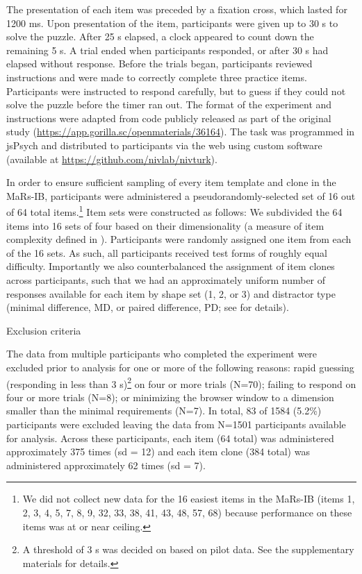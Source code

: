 \documentclass[a4paper,man,natbib]{apa6}
\makeatletter
\renewcommand{\subsubsection}{\@startsection{subsubsection}{3}
  {\z@}%
  {\b@level@two@skip}{\e@level@two@skip}%
  {\normalfont\normalsize\bfseries}}
\makeatother
\begin{document}
The presentation of each item was preceded by a fixation cross, which lasted for 1200 ms. Upon presentation of the item, participants were given up to 30 s to solve the puzzle. After 25 s elapsed, a clock appeared to count down the remaining 5 s. A trial ended when participants responded, or after 30 s had elapsed without response. Before the trials began, participants reviewed instructions and were made to correctly complete three practice items. Participants were instructed to respond carefully, but to guess if they could not solve the puzzle before the timer ran out. The format of the experiment and instructions were adapted from code publicly released as part of the original study (\url{https://app.gorilla.sc/openmaterials/36164}). The task was programmed in jsPsych \citep{de2015jspsych} and distributed to participants via the web using custom software (available at \url{https://github.com/nivlab/nivturk}). 

In order to ensure sufficient sampling of every item template and clone in the MaRs-IB, participants were administered a pseudorandomly-selected set of 16 out of 64 total items.\footnote{We did not collect new data for the 16 easiest items in the MaRs-IB (items 1, 2, 3, 4, 5, 7, 8, 9, 32, 33, 38, 41, 43, 48, 57, 68) because performance on these items was at or near ceiling.} Item sets were constructed as follows: We subdivided the 64 items into 16 sets of four based on their dimensionality (a measure of item complexity defined in \citealt{chierchia2019matrix}). Participants were randomly assigned one item from each of the 16 sets. As such, all participants received test forms of roughly equal difficulty. Importantly we also counterbalanced the assignment of item clones across participants, such that we had an approximately uniform number of responses available for each item by shape set (1, 2, or 3) and distractor type (minimal difference, MD, or paired difference, PD; see \citealt{chierchia2019matrix} for details). 

\subsubsection{Exclusion criteria}

The data from multiple participants who completed the experiment were excluded prior to analysis for one or more of the following reasons: rapid guessing (responding in less than 3 s)\footnote{A threshold of 3 s was decided on based on pilot data. See the supplementary materials for details.} on four or more trials (N=70); failing to respond on four or more trials (N=8); or minimizing the browser window to a dimension smaller than the minimal requirements (N=7). In total, 83 of 1584 (5.2\%) participants were excluded leaving the data from N=1501 participants available for analysis. Across these participants, each item (64 total) was administered approximately 375 times (sd = 12) and each item clone (384 total) was administered approximately 62 times (sd = 7). 
\end{document}
